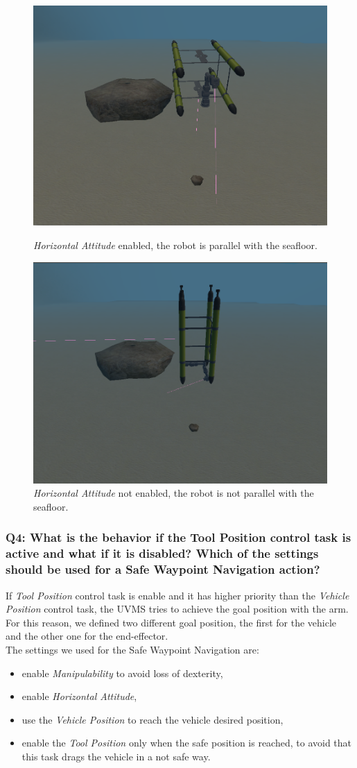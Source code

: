 \documentclass{article}
\begin{document}
\begin{figure}[!htb]
\centering
\includegraphics[width=.5\textwidth]{112_HAenabled.png}\caption{\textit{Horizontal Attitude} enabled, the robot is parallel with the seafloor.}
\label{fig:hae}
\vspace{5px}
\centering
\includegraphics[width=.5\textwidth]{112_HANotenabled.png}\caption{\textit{Horizontal Attitude} not enabled, the robot is not parallel with the seafloor.}
\label{fig:hane}
\end{figure}


\subsubsection{Q4: What is the behavior if the Tool Position control task is active and what if it is disabled? Which of the settings should be used for a Safe Waypoint Navigation action?}
If \textit{Tool Position} control task is enable and it has higher priority than the \textit{Vehicle Position} control task, the UVMS tries to achieve the goal position with the arm. \\
For this reason, we defined two different goal position, the first for the vehicle and the other one for the end-effector. \\
The settings we used for the Safe Waypoint Navigation are:
\begin{itemize}
\item enable \textit{Manipulability} to avoid loss of dexterity,
\item enable \textit{Horizontal Attitude},
\item use the \textit{Vehicle Position} to reach the vehicle desired position,
\item enable the \textit{Tool Position} only when the safe position is reached, to avoid that this task drags the vehicle in a not safe way. 
\end{itemize}
\clearpage
\end{document}
